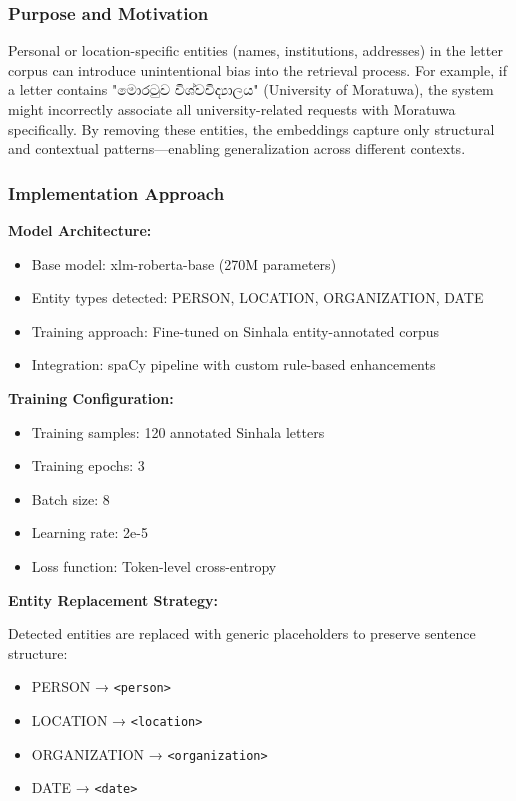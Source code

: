 \documentclass[12pt]{uomthesis}
\begin{document}
\subsubsection{Purpose and Motivation}

Personal or location-specific entities (names, institutions, addresses) in the letter corpus can introduce unintentional bias into the retrieval process. For example, if a letter contains "මොරටුව විශ්වවිද්‍යාලය" (University of Moratuwa), the system might incorrectly associate all university-related requests with Moratuwa specifically. By removing these entities, the embeddings capture only structural and contextual patterns—enabling generalization across different contexts.

\subsubsection{Implementation Approach}

\textbf{Model Architecture:}
\begin{itemize}
    \item Base model: xlm-roberta-base (270M parameters)
    \item Entity types detected: PERSON, LOCATION, ORGANIZATION, DATE
    \item Training approach: Fine-tuned on Sinhala entity-annotated corpus
    \item Integration: spaCy pipeline with custom rule-based enhancements
\end{itemize}

\textbf{Training Configuration:}

\begin{itemize}
    \item Training samples: 120 annotated Sinhala letters
    \item Training epochs: 3
    \item Batch size: 8
    \item Learning rate: 2e-5
    \item Loss function: Token-level cross-entropy
\end{itemize}

\textbf{Entity Replacement Strategy:}

Detected entities are replaced with generic placeholders to preserve sentence structure:
\begin{itemize}
    \item PERSON → \texttt{<person>}
    \item LOCATION → \texttt{<location>}
    \item ORGANIZATION → \texttt{<organization>}
    \item DATE → \texttt{<date>}
\end{itemize}
\end{document}

